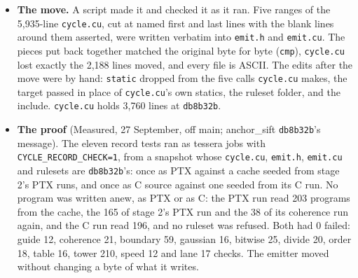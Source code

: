 \begin{enumerate}
\begin{itemize}
\begin{enumerate}
\begin{itemize}
\begin{itemize}
\item \textbf{The move.} A script made it and checked it as it ran. Five ranges of the 5,935-line \texttt{cycle.\allowbreak{}cu}, cut at named first and last lines with the blank lines around them asserted, were written verbatim into \texttt{emit.\allowbreak{}h} and \texttt{emit.\allowbreak{}cu}. The pieces put back together matched the original byte for byte (\texttt{cmp}), \texttt{cycle.\allowbreak{}cu} lost exactly the 2,188 lines moved, and every file is ASCII. The edits after the move were by hand: \texttt{static} dropped from the five calls \texttt{cycle.\allowbreak{}cu} makes, the target passed in place of \texttt{cycle.\allowbreak{}cu}'s own statics, the ruleset folder, and the include. \texttt{cycle.\allowbreak{}cu} holds 3,760 lines at \texttt{db8b32b}.
\item \textbf{The proof} (Measured, 27 September, off main; anchor\_\allowbreak{}sift \texttt{db8b32b}'s message). The eleven record tests ran as tessera jobs with \texttt{CYCLE\_\allowbreak{}RECORD\_\allowbreak{}CHECK=1}, from a snapshot whose \texttt{cycle.\allowbreak{}cu}, \texttt{emit.\allowbreak{}h}, \texttt{emit.\allowbreak{}cu} and rulesets are \texttt{db8b32b}'s: once as PTX against a cache seeded from stage 2's PTX runs, and once as C source against one seeded from its C run. No program was written anew, as PTX or as C: the PTX run read 203 programs from the cache, the 165 of stage 2's PTX run and the 38 of its coherence run again, and the C run read 196, and no ruleset was refused. Both had 0 failed: guide 12, coherence 21, boundary 59, gaussian 16, bitwise 25, divide 20, order 18, table 16, tower 210, speed 12 and lane 17 checks. The emitter moved without changing a byte of what it writes.

\end{itemize}
\end{itemize}
\end{enumerate}
\end{itemize}
\end{enumerate}
